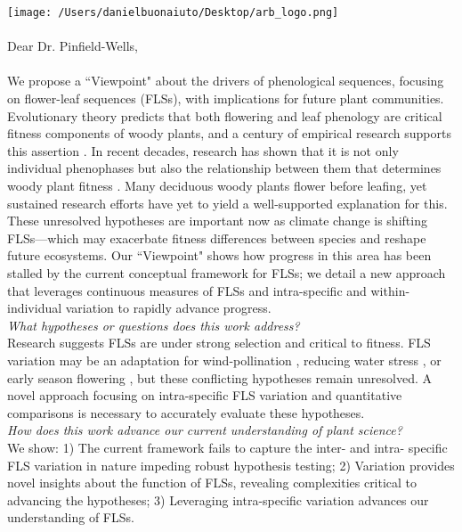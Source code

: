 \documentclass[11pt,a4paper]{article}
\begin{document}

\def\labelitemi{--}
\parindent=24pt
\texttt{[image: /Users/danielbuonaiuto/Desktop/arb\_logo.png]}
\\\\
{Dear Dr. Pinfield-Wells,}\\
\vspace{1.5ex}\\
\noindent We propose a ``Viewpoint" about the drivers of phenological sequences, focusing on flower-leaf sequences (FLSs), with implications for future plant communities. Evolutionary theory predicts that both flowering and leaf phenology are critical fitness components of woody plants, and a century of empirical research supports this assertion \citep{Munguia-Rosas2011,Forrest2010}. In recent decades, research has shown that it is not only individual phenophases but also the relationship between them that determines woody plant fitness \citep{Menzel1999,Ettinger2018}. Many deciduous woody plants flower before leafing, yet sustained research efforts have yet to yield a well-supported explanation for this. These unresolved hypotheses are important now as climate change is shifting FLSs---which may exacerbate fitness differences between species and reshape future ecosystems. Our ``Viewpoint" shows how progress in this area has been stalled by the current conceptual framework for FLSs; we detail a new approach that leverages continuous measures of FLSs and intra-specific and within-individual variation to rapidly advance progress.\\

\noindent \emph{What hypotheses or questions does this work address?}\\
\noindent Research suggests FLSs are under strong selection and critical to fitness. FLS variation may be an adaptation for wind-pollination \citep{Rathcke_1985}, reducing water stress \citep{Reich1984}, or early season flowering \citep{Primack1987}, but these conflicting hypotheses remain unresolved. A novel approach focusing on intra-specific FLS variation and quantitative comparisons is necessary to accurately evaluate these hypotheses.\\

\noindent \emph{How does this work advance our current understanding of plant science?}\\

\noindent We show: 1) The current framework fails to capture the inter- and intra- specific FLS variation in nature impeding robust hypothesis testing; 2) Variation provides novel insights about the function of FLSs, revealing complexities critical to advancing the hypotheses; 3) Leveraging intra-specific variation advances our understanding of FLSs.\\ %
\end{document}
